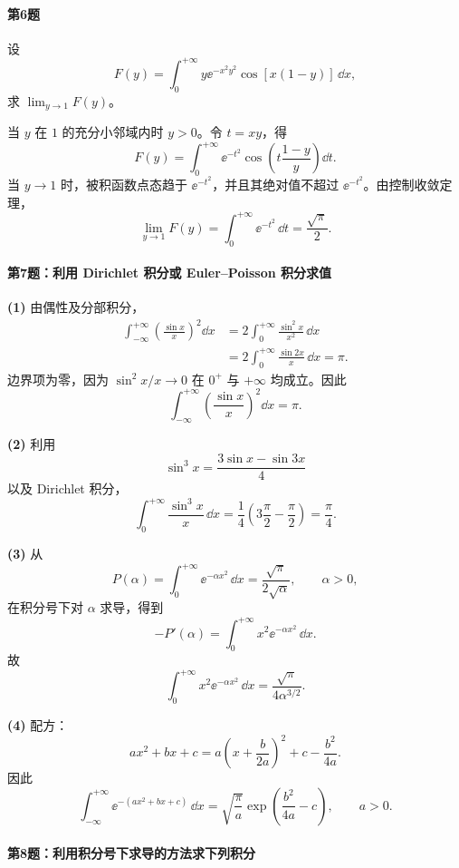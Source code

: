 \paragraph{第6题}
设
\[
F(y)=\int_0^{+\infty}y\ee^{-x^2y^2}\cos[x(1-y)]\,\dd x,
\]
求 $\lim_{y\to1}F(y)$。

\begin{xsolution}
当 $y$ 在 $1$ 的充分小邻域内时 $y>0$。令 $t=xy$，得
\[
F(y)=\int_0^{+\infty}\ee^{-t^2}
\cos\left(t\frac{1-y}{y}\right)\dd t.
\]
当 $y\to1$ 时，被积函数点态趋于 $\ee^{-t^2}$，并且其绝对值不超过 $\ee^{-t^2}$。由控制收敛定理，
\[
\boxed{
\lim_{y\to1}F(y)
=\int_0^{+\infty}\ee^{-t^2}\,\dd t
=\frac{\sqrt\pi}{2}.}
\]
\end{xsolution}

\paragraph{第7题：利用 Dirichlet 积分或 Euler--Poisson 积分求值}

\begin{xsolution}
\textbf{(1)} 由偶性及分部积分，
\[
\begin{aligned}
\int_{-\infty}^{+\infty}\left(\frac{\sin x}{x}\right)^2\dd x
&=2\int_0^{+\infty}\frac{\sin^2x}{x^2}\,\dd x\\
&=2\int_0^{+\infty}\frac{\sin2x}{x}\,\dd x=\pi.
\end{aligned}
\]
边界项为零，因为 $\sin^2x/x\to0$ 在 $0^+$ 与 $+\infty$ 均成立。因此
\[
\boxed{\displaystyle\int_{-\infty}^{+\infty}
\left(\frac{\sin x}{x}\right)^2\dd x=\pi}.
\]

\textbf{(2)} 利用
\[
\sin^3x=\frac{3\sin x-\sin3x}{4}
\]
以及 Dirichlet 积分，
\[
\boxed{
\int_0^{+\infty}\frac{\sin^3x}{x}\,\dd x
=\frac14\left(3\frac\pi2-\frac\pi2\right)=\frac\pi4.}
\]

\textbf{(3)} 从
\[
P(\alpha)=\int_0^{+\infty}\ee^{-\alpha x^2}\,\dd x
=\frac{\sqrt\pi}{2\sqrt\alpha},
\qquad\alpha>0,
\]
在积分号下对 $\alpha$ 求导，得到
\[
-P'(\alpha)=\int_0^{+\infty}x^2\ee^{-\alpha x^2}\,\dd x.
\]
故
\[
\boxed{
\int_0^{+\infty}x^2\ee^{-\alpha x^2}\,\dd x
=\frac{\sqrt\pi}{4\alpha^{3/2}}.}
\]

\textbf{(4)} 配方：
\[
ax^2+bx+c=a\left(x+\frac b{2a}\right)^2+c-\frac{b^2}{4a}.
\]
因此
\[
\boxed{
\int_{-\infty}^{+\infty}\ee^{-(ax^2+bx+c)}\,\dd x
=\sqrt{\frac\pi a}\exp\left(\frac{b^2}{4a}-c\right),
\qquad a>0.}
\]
\end{xsolution}

\paragraph{第8题：利用积分号下求导的方法求下列积分}

